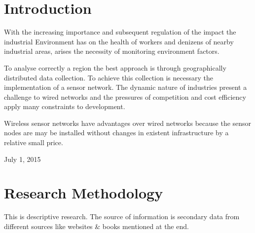 \documentclass[conference]{IEEEtran}
\begin{document}

%
\IEEEpeerreviewmaketitle



\section{Introduction}

With the increasing importance and subsequent regulation of the impact the industrial Environment has on the health of workers and denizens of nearby industrial areas, arises the necessity of monitoring environment factors.

To analyse correctly a region the best approach is through geographically distributed data collection. To achieve this collection is necessary the implementation of a sensor network.
The dynamic nature of industries present a challenge to wired networks and the pressures of competition and cost efficiency apply many constraints to development.

Wireless sensor networks have advantages over wired networks because the sensor nodes are may be installed without changes in existent infrastructure by a relative small price\cite{PavithraL2015}.



 
\hfill July 1, 2015

\section{Research Methodology}
This is descriptive research. The source of information is secondary data from different sources like websites \& books mentioned at the end.
\end{document}
